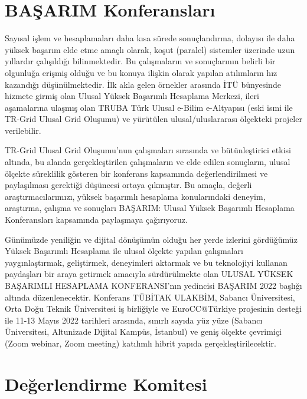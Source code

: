 \section{BAŞARIM Konferansları}

Sayısal işlem ve hesaplamaları daha kısa sürede sonuçlandırma, dolayısı ile daha yüksek başarım elde etme amaçlı olarak, koşut (paralel) sistemler üzerinde uzun yıllardır çalışıldığı bilinmektedir. Bu çalışmaların ve sonuçlarının belirli bir olgunluğa erişmiş olduğu ve bu konuya ilişkin olarak yapılan atılımların hız kazandığı düşünülmektedir. İlk akla gelen örnekler arasında İTÜ bünyesinde hizmete girmiş olan Ulusal Yüksek Başarımlı Hesaplama Merkezi, ileri aşamalarına ulaşmış olan TRUBA Türk Ulusal e-Bilim e-Altyapısı (eski ismi ile TR-Grid Ulusal Grid Oluşumu) ve yürütülen ulusal/uluslararası ölçekteki projeler verilebilir.

TR-Grid Ulusal Grid Oluşumu'nun çalışmaları sırasında ve bütünleştirici etkisi altında, bu alanda gerçekleştirilen çalışmaların ve elde edilen sonuçların, ulusal ölçekte süreklilik gösteren bir konferans kapsamında değerlendirilmesi ve paylaşılması gerektiği düşüncesi ortaya çıkmıştır. Bu amaçla, değerli araştırmacılarımızı, yüksek başarımlı hesaplama konularındaki deneyim, araştırma, çalışma ve sonuçları BAŞARIM: Ulusal Yüksek Başarımlı Hesaplama Konferansları kapsamında paylaşmaya çağırıyoruz.

Günümüzde yeniliğin ve dijital dönüşümün olduğu her yerde izlerini gördüğümüz Yüksek Başarımlı Hesaplama ile ulusal ölçekte yapılan çalışmaları yaygınlaştırmak, geliştirmek, deneyimleri aktarmak ve bu teknolojiyi kullanan paydaşları bir araya getirmek amacıyla sürdürülmekte olan ULUSAL YÜKSEK BAŞARIMLI HESAPLAMA KONFERANSI’nın yedincisi BAŞARIM 2022 başlığı altında düzenlenecektir. Konferans TÜBİTAK ULAKBİM, Sabancı Üniversitesi, Orta Doğu Teknik Üniversitesi iş birliğiyle ve EuroCC@Türkiye projesinin desteği ile 11-13 Mayıs 2022 tarihleri arasında,  sınırlı sayıda yüz yüze  (Sabancı Üniversitesi, Altunizade Dijital Kampüs, İstanbul) ve geniş ölçekte çevrimiçi (Zoom webinar, Zoom meeting) katılımlı hibrit yapıda gerçekleştirilecektir. 

\newpage
\section{Değerlendirme Komitesi}

